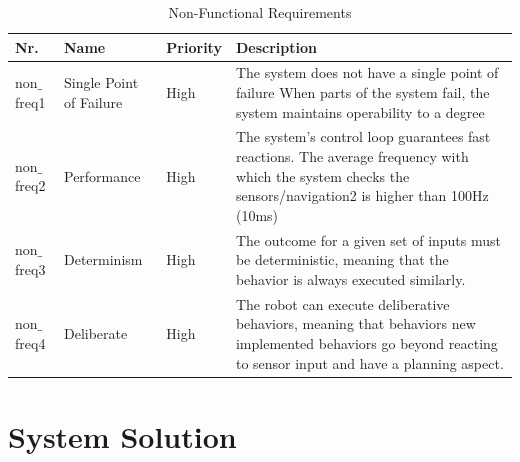 \begin{table}[ht]
	\caption{Non-Functional Requirements}
	\label{tab:nonfn_req}
	\begin{tabular}{ | m{} | m{}| m{} | m{} |} 
  	\hline
  	\textbf{Nr.} & \textbf{Name} & \textbf{Priority} & \textbf{Description} \\ 
  	\hline
  	non$\_$freq1 & Single Point of Failure & High &  The system does not have a single point of failure	When parts of the system fail, the system maintains operability to a degree \\ 
  	\hline
  	non$\_$freq2 & Performance & High & The system's control loop guarantees fast reactions. The average frequency with which the system checks the sensors/navigation2 is higher than 100Hz (10ms) \\ 
  	\hline
  	non$\_$freq3 & Determinism & High & The outcome for a given set of inputs must be deterministic, meaning that the behavior is always executed similarly. \\
  	\hline
  	non$\_$freq4 & Deliberate & High & The robot can execute deliberative behaviors, meaning that behaviors new implemented behaviors go beyond reacting to sensor input and have a planning aspect. \\
  	\hline
	\end{tabular}
\end{table}


\section{System Solution}

